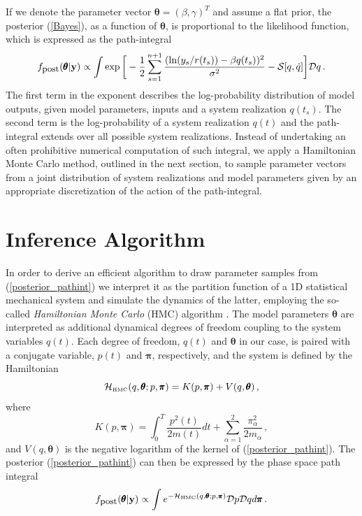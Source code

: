 \documentclass[12pt,a4paper,final]{iopart}
\newcommand{\bt}{\pmb\theta}
\newcommand{\vc}[1]{{\bf #1 }}
\begin{document}
If we denote the parameter vector $\bt=(\beta,\gamma)^T$ and assume a flat prior, the posterior (\ref{Bayes}), as a function of $\bt$, is proportional to the likelihood function, which is expressed as the path-integral
\begin{equation}\label{posterior_pathint}
  f_{\mbox{\small post}}(\bt | \vc y)
  \propto
  \int
  \exp\bigg[
    -\frac{1}{2}
    \sum_{s=1}^{n+1}
    \frac
    {(\ln(y_s/r(t_s))-{\beta q(t_s)})^2}
    {\sigma^2} -{{\mathcal S}}[{q},\dot q]
  \bigg]
  {\mathcal Dq}
  \,.
\end{equation}
The first term in the exponent describes the log-probability distribution of model outputs, given model parameters, inputs and a system realization $q(t_s)$. The second term is the log-probability of a system realization $q(t)$ and the path-integral extends over all possible system realizations. Instead of undertaking an often prohibitive numerical computation of such integral, we apply a Hamiltonian Monte Carlo method, outlined in the next section, to sample parameter vectors from a joint distribution of system realizations and model parameters given by an appropriate discretization of the action of the path-integral.



\section{Inference Algorithm}

In order to derive an efficient algorithm to draw parameter samples from (\ref{posterior_pathint}) we interpret it as the partition function of a 1D statistical mechanical system and simulate the dynamics of the latter, employing the so-called {\em Hamiltonian Monte Carlo} (HMC) algorithm \cite{duane_1987}.
The model parameters $\bt$ are interpreted as additional dynamical degrees of freedom coupling to the system variables $q(t)$.
Each degree of freedom, $q(t)$ and $\bt$ in our case, is paired with a conjugate variable, $p(t)$ and ${\pmb\pi}$, respectively, and the system is defined by the  Hamiltonian
\begin{equation}\label{Hamiltonian}
    \mathcal{H}_{\mbox{\tiny HMC}}(q,\bt; p,{\pmb\pi})
    =
    K( p,{\pmb\pi}) + V( q,\bt)\,,
\end{equation}
where
\begin{equation}\label{K}
   K( p,{\pmb\pi})
   =
   \int_0^T \frac{ p^2(t)}{2m(t)}dt
   + \sum_{\alpha=1}^2\frac{\pi_\alpha^2}{2m_\alpha}\,,
\end{equation}
and $V( q,\bt)$ is the negative logarithm of the kernel of (\ref{posterior_pathint}).
The posterior (\ref{posterior_pathint}) can then be expressed by the phase space path integral
\begin{equation}\label{phaseSpacePathInt}
    f_{\mbox{\small post}}(\bt | \vc y)
  \propto
  \int
  e^{-\mathcal {H}_{\mbox{\tiny HMC}}(q,\bt; p,{\pmb\pi})}
  {\mathcal Dp}
   {\mathcal Dq}
   d{\pmb\pi}
  \,.
\end{equation}
\end{document}
